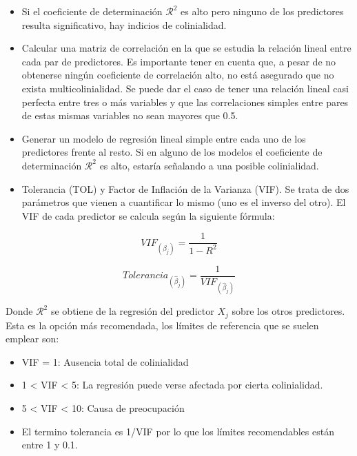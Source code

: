 {\begin{itemize}
    \item Si el coeficiente de determinación $\mathcal{R}^2$ es alto pero ninguno de los predictores resulta significativo, hay indicios de colinialidad.
    \item Calcular una matriz de correlación en la que se estudia la relación lineal entre cada par de predictores. Es importante tener en cuenta que, a pesar de no obtenerse ningún coeficiente de correlación alto, no está asegurado que no exista multicolinialidad. Se puede dar el caso de tener una relación lineal casi perfecta entre tres o más variables y que las correlaciones simples entre pares de estas mismas variables no sean mayores que 0.5.
    \item Generar un modelo de regresión lineal simple entre cada uno de los predictores frente al resto. Si en alguno de los modelos el coeficiente de determinación $\mathcal{R}^2$ es alto, estaría señalando a una posible colinialidad.
    \item Tolerancia (TOL) y Factor de Inflación de la Varianza (VIF). Se trata de dos parámetros que vienen a cuantificar lo mismo (uno es el inverso del otro). El VIF de cada predictor se calcula según la siguiente fórmula:
\end{itemize}

\begin{equation}
    VIF_(\hat{\beta}_j) = \frac{1}{1 - R^2}
\end{equation}

\begin{equation}
    Tolerancia_(\hat{\beta}_j) = \frac{1}{VIF_(\hat{\beta}_j)}
\end{equation}

Donde $\mathcal{R}^2$ se obtiene de la regresión del predictor $X_j$ sobre los otros predictores. Esta es la opción más recomendada, los límites de referencia que se suelen emplear son:

\begin{itemize}
    \item VIF = 1: Ausencia total de colinialidad
    \item 1 < VIF < 5: La regresión puede verse afectada por cierta colinialidad.
    \item 5 < VIF < 10: Causa de preocupación
    \item El termino tolerancia es 1/VIF por lo que los límites recomendables están entre 1 y 0.1.
\end{itemize}

}
